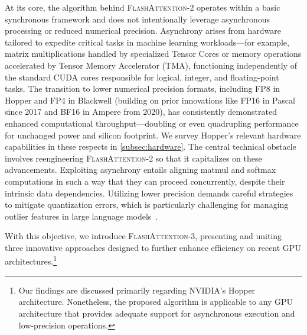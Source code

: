 At its core, the algorithm behind \textsc{FlashAttention-2} operates within a basic synchronous framework and does not intentionally leverage asynchronous processing or reduced numerical precision. Asynchrony arises from hardware tailored to expedite critical tasks in machine learning workloads—for example, matrix multiplications handled by specialized Tensor Cores or memory operations accelerated by Tensor Memory Accelerator (TMA), functioning independently of the standard CUDA cores responsible for logical, integer, and floating-point tasks. The transition to lower numerical precision formats, including FP8 in Hopper and FP4 in Blackwell (building on prior innovations like FP16 in Pascal since 2017 and BF16 in Ampere from 2020), has consistently demonstrated enhanced computational throughput—doubling or even quadrupling performance for unchanged power and silicon footprint. We survey Hopper’s relevant hardware capabilities in these respects in \cref{subsec:hardware}. 
The central technical obstacle involves reengineering \textsc{FlashAttention-2} so that it capitalizes on these advancements. Exploiting asynchrony entails aligning matmul and softmax computations in such a way that they can proceed concurrently, despite their intrinsic data dependencies. Utilizing lower precision demands careful strategies to mitigate quantization errors, which is particularly challenging for managing outlier features in large language models~\citep{dettmers2208llm, sun2024massive}.

With this objective, we introduce \textsc{FlashAttention-3}, presenting and uniting three innovative approaches designed to further enhance efficiency on recent GPU architectures.\footnote{Our findings are discussed primarily regarding NVIDIA's Hopper architecture. Nonetheless, the proposed algorithm is applicable to any GPU architecture that provides adequate support for asynchronous execution and low-precision operations.}

